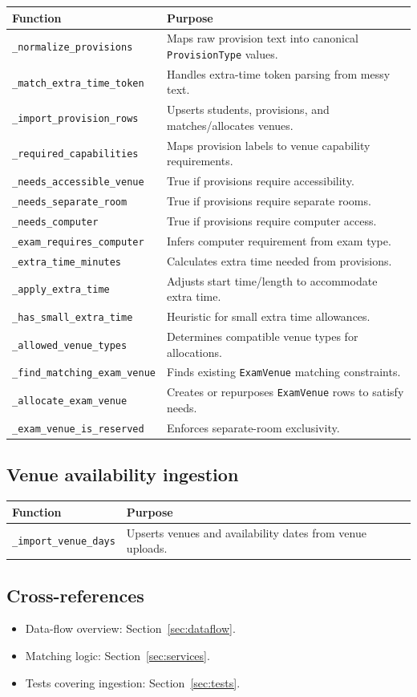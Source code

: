 \begin{longtable}{p{}p{}}
\toprule
\textbf{Function} & \textbf{Purpose} \\
\midrule
\texttt{\_normalize\_provisions} & Maps raw provision text into canonical \texttt{ProvisionType} values. \\
\texttt{\_match\_extra\_time\_token} & Handles extra-time token parsing from messy text. \\
\texttt{\_import\_provision\_rows} & Upserts students, provisions, and matches/allocates venues. \\
\texttt{\_required\_capabilities} & Maps provision labels to venue capability requirements. \\
\texttt{\_needs\_accessible\_venue} & True if provisions require accessibility. \\
\texttt{\_needs\_separate\_room} & True if provisions require separate rooms. \\
\texttt{\_needs\_computer} & True if provisions require computer access. \\
\texttt{\_exam\_requires\_computer} & Infers computer requirement from exam type. \\
\texttt{\_extra\_time\_minutes} & Calculates extra time needed from provisions. \\
\texttt{\_apply\_extra\_time} & Adjusts start time/length to accommodate extra time. \\
\texttt{\_has\_small\_extra\_time} & Heuristic for small extra time allowances. \\
\texttt{\_allowed\_venue\_types} & Determines compatible venue types for allocations. \\
\texttt{\_find\_matching\_exam\_venue} & Finds existing \texttt{ExamVenue} matching constraints. \\
\texttt{\_allocate\_exam\_venue} & Creates or repurposes \texttt{ExamVenue} rows to satisfy needs. \\
\texttt{\_exam\_venue\_is\_reserved} & Enforces separate-room exclusivity. \\
\bottomrule
\end{longtable}

\subsection{Venue availability ingestion}
\label{subsec:uploadprocessor:venues}

\begin{longtable}{p{}p{}}
\toprule
\textbf{Function} & \textbf{Purpose} \\
\midrule
\texttt{\_import\_venue\_days} & Upserts venues and availability dates from venue uploads. \\
\bottomrule
\end{longtable}

\subsection{Cross-references}
\label{subsec:uploadprocessor:links}

\begin{itemize}
  \item Data-flow overview: Section~\ref{sec:dataflow}.
  \item Matching logic: Section~\ref{sec:services}.
  \item Tests covering ingestion: Section~\ref{sec:tests}.
\end{itemize}

